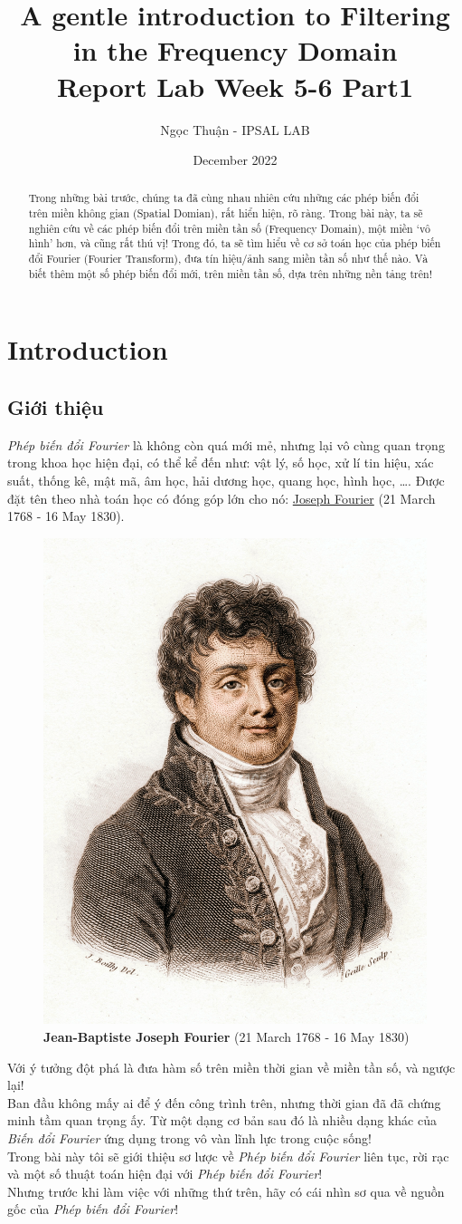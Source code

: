 \documentclass{article}
\title{A gentle introduction to Filtering in the Frequency Domain\\ \Large Report Lab Week 5-6 Part1}
\author{Ngọc Thuận - IPSAL LAB}
\date{December 2022}
\begin{document}
\maketitle
\begin{abstract}
    Trong những bài trước, chúng ta đã cùng nhau nhiên cứu những các phép biến đổi trên miền không gian (Spatial Domian), rất hiển hiện, rõ ràng. Trong bài này, ta sẽ nghiên cứu về các phép biến đổi trên miền tần số (Frequency Domain), một miền `vô hình' hơn, và cũng rất thú vị! Trong đó, ta sẽ tìm hiểu về cơ sở toán học của phép biến đổi Fourier (Fourier Transform), đưa tín hiệu/ảnh sang miền tần số như thế nào. Và biết thêm một số phép biến đổi mới, trên miền tần số, dựa trên những nền tảng trên!
\end{abstract}
\tableofcontents


\newpage

\section{Introduction}
    \subsection{Giới thiệu}
    \textit{Phép biến đổi Fourier} là không còn quá mới mẻ, nhưng lại vô cùng quan trọng trong khoa học hiện đại, có thể kể đến như: vật lý, số học, xử lí tin hiệu, xác suất, thống kê, mật mã, âm học, hải dương học, quang học, hình học, \ldots. Được đặt tên theo nhà toán học có đóng góp lớn cho nó: \href{https://en.wikipedia.org/wiki/Joseph_Fourier}{Joseph Fourier}
     (21 March 1768 - 16 May 1830). 
     \begin{figure}[ht!]
        \centering
        \includegraphics[width = 0.4\linewidth]{Fourier.jpg}
        \caption{\textbf{Jean-Baptiste Joseph Fourier} (21 March 1768 - 16 May 1830)}
        \label{fig1}
     \end{figure}
     Với ý tưởng đột phá là đưa hàm số trên miền thời gian về miền tần số, và ngược lại!\\
    Ban đầu không mấy ai để ý đến công trình trên, nhưng thời gian đã đã chứng minh tầm quan trọng ấy. Từ một dạng cơ bản sau đó là nhiều dạng khác của \textit{Biến đổi Fourier} ứng dụng trong vô vàn lĩnh lực trong cuộc sống!\\
    Trong bài này tôi sẽ giới thiệu sơ lược về \textit{Phép biến đổi Fourier} liên tục, rời rạc và một số thuật toán hiện đại với \textit{Phép biến đổi Fourier}! \\Nhưng trước khi làm việc với những thứ trên, hãy có cái nhìn sơ qua về nguồn gốc của \textit{Phép biến đổi Fourier}!
\end{document}
